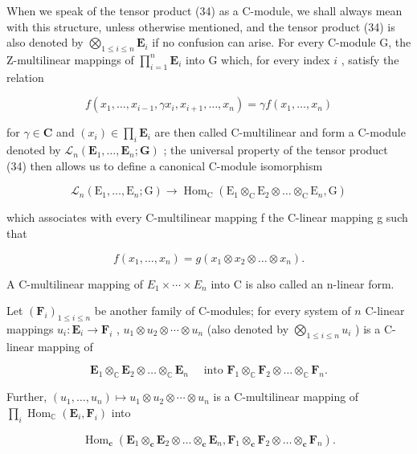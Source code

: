 When we speak of the tensor product (34) as a C-module, we shall always mean with this structure, unless otherwise mentioned, and the tensor product (34) is also denoted by \(\bigotimes_{1\leqslant i\leqslant n}\mathbf{E}_i\) if no confusion can arise. For every C-module G, the Z-multilinear mappings of \(\prod_{i=1}^{n}\mathbf{E}_i\) into G which, for every index \(i\) , satisfy the relation

\[
f (x _ {1}, \dots , x _ {i - 1}, \gamma x _ {i}, x _ {i + 1}, \dots , x _ {n}) = \gamma f (x _ {1}, \dots , x _ {n})\tag{35}
\]

for \(\gamma \in \mathbf{C}\) and \((x_{i})\in \prod_{i}\mathbf{E}_{i}\) are then called C-multilinear and form a C-module denoted by \(\mathcal{L}_n(\mathbf{E}_1,\dots ,\mathbf{E}_n;\mathbf{G})\) ; the universal property of the tensor product (34) then allows us to define a canonical C-module isomorphism

\[
\mathcal {L} _ {n} \left(\mathrm{E} _ {1}, \dots , \mathrm{E} _ {n}; \mathrm{G}\right)\rightarrow \operatorname{Hom} _ {\mathrm{C}} \left(\mathrm{E} _ {1} \otimes_ {\mathrm{C}} \mathrm{E} _ {2} \otimes \dots \otimes_ {\mathrm{C}} \mathrm{E} _ {n}, \mathrm{G}\right)\tag{36}
\]

which associates with every C-multilinear mapping f the C-linear mapping g such that

\[
f (x _ {1}, \dots , x _ {n}) = g (x _ {1} \otimes x _ {2} \otimes \dots \otimes x _ {n}).
\]

A C-multilinear mapping of \(E_{1} \times \cdots \times E_{n}\) into C is also called an n-linear form.

Let \((\mathbf{F}_i)_{1\leqslant i\leqslant n}\) be another family of C-modules; for every system of \(n\) C-linear mappings \(u_i: \mathbf{E}_i \to \mathbf{F}_i\) , \(u_1 \otimes u_2 \otimes \cdots \otimes u_n\) (also denoted by \(\bigotimes_{1\leqslant i\leqslant n} u_i\) ) is a C-linear mapping of

\[
\mathbf {E} _ {1} \otimes_ {\mathbb {C}} \mathbf {E} _ {2} \otimes \dots \otimes_ {\mathbb {C}} \mathbf {E} _ {n} \quad \text { into } \mathbf {F} _ {1} \otimes_ {\mathbb {C}} \mathbf {F} _ {2} \otimes \dots \otimes_ {\mathbb {C}} \mathbf {F} _ {n}.
\]

Further, \((u_{1},\ldots,u_{n})\mapsto u_{1}\otimes u_{2}\otimes\cdots\otimes u_{n}\) is a C-multilinear mapping of \(\prod_{i}\operatorname{Hom}_{\mathbb{C}}(\mathbf{E}_{i},\mathbf{F}_{i})\) into

\[
\operatorname{Hom} _ {\mathbf {c}} (\mathbf {E} _ {1} \otimes_ {\mathbf {c}} \mathbf {E} _ {2} \otimes \dots \otimes_ {\mathbf {c}} \mathbf {E} _ {n}, \mathbf {F} _ {1} \otimes_ {\mathbf {c}} \mathbf {F} _ {2} \otimes \dots \otimes_ {\mathbf {c}} \mathbf {F} _ {n}).
\]

